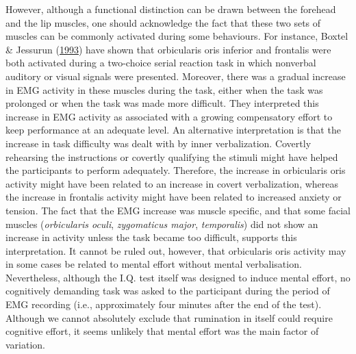 \documentclass[a4paper,12pt,twoside,openright,oldfontcommands]{memoir}
\begin{document}
However, although a functional distinction can be drawn between the forehead and the lip muscles, one should acknowledge the fact that these two sets of muscles can be commonly activated during some behaviours. For instance, Boxtel \& Jessurun (\protect\hyperlink{ref-van_boxtel_amplitude_1993}{1993}) have shown that orbicularis oris inferior and frontalis were both activated during a two-choice serial reaction task in which nonverbal auditory or visual signals were presented. Moreover, there was a gradual increase in EMG activity in these muscles during the task, either when the task was prolonged or when the task was made more difficult. They interpreted this increase in EMG activity as associated with a growing compensatory effort to keep performance at an adequate level. An alternative interpretation is that the increase in task difficulty was dealt with by inner verbalization. Covertly rehearsing the instructions or covertly qualifying the stimuli might have helped the participants to perform adequately. Therefore, the increase in orbicularis oris activity might have been related to an increase in covert verbalization, whereas the increase in frontalis activity might have been related to increased anxiety or tension. The fact that the EMG increase was muscle specific, and that some facial muscles (\emph{orbicularis oculi}, \emph{zygomaticus major}, \emph{temporalis}) did not show an increase in activity unless the task became too difficult, supports this interpretation. It cannot be ruled out, however, that orbicularis oris activity may in some cases be related to mental effort without mental verbalisation. Nevertheless, although the I.Q. test itself was designed to induce mental effort, no cognitively demanding task was asked to the participant during the period of EMG recording (i.e., approximately four minutes after the end of the test). Although we cannot absolutely exclude that rumination in itself could require cognitive effort, it seems unlikely that mental effort was the main factor of variation.
\end{document}

